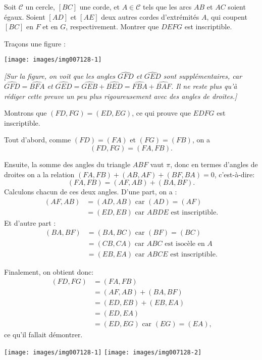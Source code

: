 \begin{exo}[Pentagramme] %

Soit $\mathcal C$ un cercle, $[BC]$ une corde, et $A \in \mathcal C$ tels que les arcs $AB$ et $AC$ soient égaux. Soient $[AD]$ et $[AE]$ deux autres cordes d'extrémités $A$, qui coupent $[BC]$ en $F$ et en $G$, respectivement. Montrer que $DEFG$ est inscriptible.

\begin{sol} 
Traçons une figure :

\begin{center}
\texttt{[image: images/img007128-1]}
\end{center}


\emph{[Sur la figure, on voit que les angles $\widehat{GFD}$ et $\widehat{GED}$ sont supplémentaires, car $\widehat{GFD}=\widehat{BFA}$ et $\widehat{GED}=\widehat{GEB}+\widehat{BED} = \widehat{FBA}+\widehat{BAF}$. Il ne reste plus qu'à rédiger cette preuve un peu plus rigoureusement avec des angles de droites.]}

Montrons que $(FD,FG)=(ED,EG)$, ce qui prouve que $EDFG$ est inscriptible.

Tout d'abord, comme $(FD)=(FA)$ et $(FG)=(FB)$, on a 
\[(FD,FG)=(FA,FB).\]

Ensuite, la somme des angles du triangle $ABF$ vaut $\pi$, donc en termes d'angles de droites on a la relation 
$(FA,FB)+(AB,AF)+(BF,BA)=0$, c'est-à-dire:
\[
(FA,FB) = (AF,AB)+(BA,BF).
\]
Calculons chacun de ces deux angles. D'une part, on a :
\begin{align*}
(AF,AB) &= (AD,AB) \text{ car $(AD)=(AF)$}\\
&=(ED,EB) \text{ car $ABDE$ est inscriptible}.
\end{align*}
Et d'autre part :
\begin{align*}
(BA,BF) &= (BA,BC) \text{ car $(BF)=(BC)$} \\
&= (CB,CA) \text{ car $ABC$ est isocèle en $A$}\\
&= (EB,EA) \text{ car $ABCE$ est inscriptible.}
\end{align*}

Finalement, on obtient donc:
\begin{align*}
(FD,FG)&=(FA,FB) \\
&= (AF,AB)+(BA,BF) \\
&= (ED,EB) + (EB,EA)\\
&= (ED,EA)\\
&= (ED,EG) \text{ car $(EG)=(EA)$,}
\end{align*}
ce qu'il fallait démontrer.
\begin{center}
\texttt{[image: images/img007128-1]}
\texttt{[image: images/img007128-2]}
\end{center}

\end{sol}  

\end{exo}  



